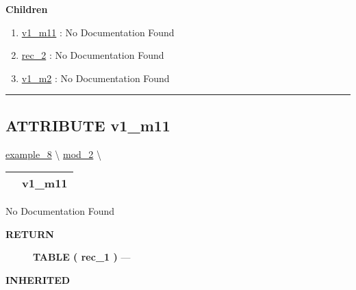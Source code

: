 \textbf{Children}
\begin{enumerate}
\item \hyperlink{ecldoc:example_8.mod_1.mod_11.v1_m11}{v1\_m11}
: No Documentation Found
\item \hyperlink{ecldoc:example_8.mod_2.rec_2}{rec\_2}
: No Documentation Found
\item \hyperlink{ecldoc:example_8.mod_2.v1_m2}{v1\_m2}
: No Documentation Found
\end{enumerate}

\rule{\linewidth}{0.5pt}

\subsection*{\textsf{\colorbox{headtoc}{\color{white} ATTRIBUTE}
v1\_m11}}

\hypertarget{ecldoc:example_8.mod_1.mod_11.v1_m11}{}
\hspace{0pt} \hyperlink{ecldoc:example_8}{example_8} \textbackslash 
\hspace{0pt} \hyperlink{ecldoc:example_8.mod_2}{mod_2} \textbackslash 

{\renewcommand{\arraystretch}{1.5}
\begin{tabularx}{\textwidth}{|>{\raggedright\arraybackslash}l|X|}
\hline
\hspace{0pt}\mytexttt{\color{red} } & \textbf{v1\_m11} \\
\hline
\end{tabularx}
}

\par





No Documentation Found








\par
\begin{description}
\item [\colorbox{tagtype}{\color{white} \textbf{\textsf{RETURN}}}] \textbf{TABLE ( rec\_1 )} --- 
\end{description}






\par
\begin{description}
\item [\colorbox{tagtype}{\color{white} \textbf{\textsf{INHERITED}}}] 
\end{description}



